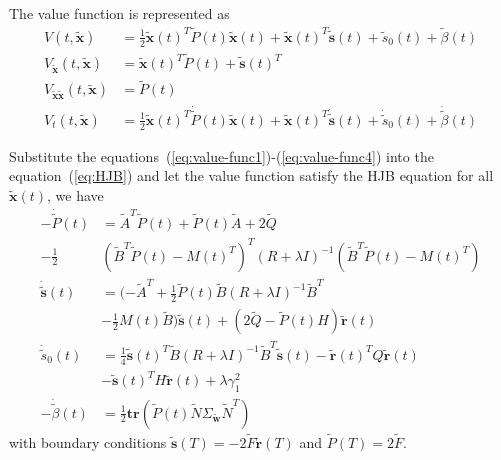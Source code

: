\documentclass[journal]{IEEEtran}
\begin{document}
The value function is represented as \cite{anderson2007optimal}
\begin{align}
    \label{eq:value-func1}
    V(t,\widetilde{\mathbf{x}}) &= \frac{1}{2}\widetilde{\mathbf{x}}(t)^{T}\widetilde{P}(t)\widetilde{\mathbf{x}}(t) + \widetilde{\mathbf{x}}(t)^{T}\widetilde{\mathbf{s}}(t) + \widetilde{s}_{0}(t) + \widetilde{\beta}(t) \\
    \label{eq:value-func2}
    V_{\widetilde{\mathbf{x}}}(t,\widetilde{\mathbf{x}}) &= \widetilde{\mathbf{x}}(t)^T\widetilde{P}(t) + \widetilde{\mathbf{s}}(t)^T \\
    \label{eq:value-func3}
    V_{\widetilde{\mathbf{x}}\widetilde{\mathbf{x}}}(t,\widetilde{\mathbf{x}}) &= \widetilde{P}(t) \\
    \label{eq:value-func4}
    V_t(t,\widetilde{\mathbf{x}}) &= \frac{1}{2}\widetilde{\mathbf{x}}(t)^{T}\dot{\widetilde{P}}(t)\widetilde{\mathbf{x}}(t) + \widetilde{\mathbf{x}}(t)^{T}\dot{\widetilde{\mathbf{s}}}(t) + \dot{\widetilde{s}}_{0}(t) + \dot{\widetilde{\beta}}(t) 
\end{align}

Substitute the equations~(\ref{eq:value-func1})-(\ref{eq:value-func4}) into the equation~(\ref{eq:HJB}) and let the value function satisfy the HJB equation for all $\widetilde{\mathbf{x}}(t)$, we have
\begin{align}
    -\dot{\widetilde{P}}(t) &= \widetilde{A}^{T}\widetilde{P}(t) + \widetilde{P}(t)\widetilde{A} + 2\widetilde{Q} \nonumber\\
    - \frac{1}{2}&(\widetilde{B}^{T}\widetilde{P}(t) - M(t)^T)^T(R+\lambda I)^{-1}(\widetilde{B}^{T}\widetilde{P}(t) - M(t)^T)  \\
    \dot{\widetilde{\mathbf{s}}}(t) &= (-\widetilde{A}^{T} + \frac{1}{2}\widetilde{P}(t)\widetilde{B}(R+\lambda I)^{-1}\widetilde{B}^T \nonumber\\
    &- \frac{1}{2}M(t)\widetilde{B})\widetilde{\mathbf{s}}(t) + (2\widetilde{Q} - \widetilde{P}(t)H)\widetilde{\mathbf{r}}(t) \\
    \dot{\widetilde{s}}_{0}(t) &=  \frac{1}{4}\widetilde{\mathbf{s}}(t)^T\widetilde{B}(R+\lambda I)^{-1}\widetilde{B}^T\widetilde{\mathbf{s}}(t) - \widetilde{\mathbf{r}}(t)^{T}Q\widetilde{\mathbf{r}}(t) \nonumber\\
    &- \widetilde{\mathbf{s}}(t)^TH\widetilde{\mathbf{r}}(t) + \lambda \gamma_1^2\\
    -\dot{\widetilde{\beta}}(t) &= \frac{1}{2}\mathbf{tr}(\widetilde{P}(t)\widetilde{N}\Sigma_{\widetilde{\mathbf{w}}}\widetilde{N}^T) 
\end{align}
with boundary conditions $\widetilde{\mathbf{s}}(T) = -2\widetilde{F}\widetilde{\mathbf{r}}(T)$ and $\widetilde{P}(T) = 2\widetilde{F}.$
\end{document}
